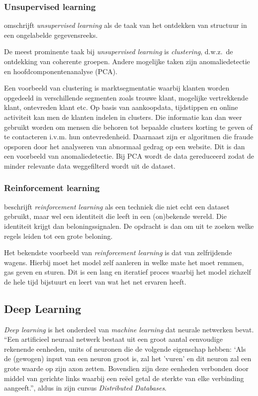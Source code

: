 \subsubsection{Unsupervised learning}
\textcite{Lievens2021} omschrijft \textit{unsupervised learning} als de taak van het ontdekken van structuur in een ongelabelde gegevensreeks.

De meest prominente taak bij \textit{unsupervised learning} is \textit{clustering}, d.w.z.\ de ontdekking van coherente groepen. Andere mogelijke taken zijn anomaliedetectie en hoofdcomponentenanalyse (PCA).

Een voorbeeld van clustering is marktsegmentatie waarbij klanten worden opgedeeld in verschillende segmenten zoals trouwe klant, mogelijke vertrekkende klant, ontevreden klant etc. Op basis van aankoopdata, tijdstippen en online activiteit kan men de klanten indelen in clusters. Die informatie kan dan weer gebruikt worden om mensen die behoren tot bepaalde clusters korting te geven of te contacteren i.v.m. hun ontevredenheid.
Daarnaast zijn er algoritmen die fraude opsporen door het analyseren van abnormaal gedrag op een website. Dit is dan een voorbeeld van anomaliedetectie.
Bij PCA wordt de data gereduceerd zodat de minder relevante data weggefilterd wordt uit de dataset.

\subsubsection{Reinforcement learning}
\textcite{Lievens2021} beschrijft \textit{reinforcement learning} als een techniek die niet echt een dataset gebruikt, maar wel een identiteit die leeft in een (on)bekende wereld. Die identiteit krijgt dan beloningssignalen. De opdracht is dan om uit te zoeken welke regels leiden tot een grote beloning.

Het bekendste voorbeeld van \textit{reinforcement learning} is dat van zelfrijdende wagens. Hierbij moet het model zelf aanleren in welke mate het moet remmen, gas geven en sturen. Dit is een lang en iteratief proces waarbij het model zichzelf de hele tijd bijstuurt en leert van wat het net ervaren heeft.

\subsection{Deep Learning}
\textit{Deep learning} is het onderdeel van \textit{machine learning} dat neurale netwerken bevat.
``Een artificieel neuraal netwerk bestaat uit een groot aantal eenvoudige rekenende eenheden, units of neuronen die de volgende eigenschap hebben: `Als de (gewogen) input van een neuron groot is, zal het 'vuren' en dit neuron zal een grote waarde op zijn axon zetten. Bovendien zijn deze eenheden verbonden door middel van gerichte links waarbij een reëel getal de sterkte van elke verbinding aangeeft.'', aldus \textcite{Lievens2021} in zijn cursus \textit{Distributed Databases}.

